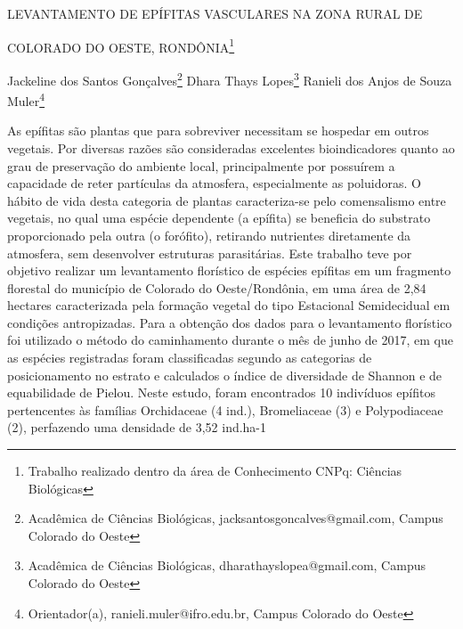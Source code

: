 \documentclass[article,12pt,onesidea,4paper,english,brazil]{abntex2}
\begin{document}
	
	
	\frenchspacing 
	
	\begin{center}
		\LARGE LEVANTAMENTO DE EPÍFITAS VASCULARES NA ZONA RURAL DE
		
		COLORADO DO OESTE, RONDÔNIA\footnote{Trabalho realizado dentro da área de Conhecimento CNPq: Ciências Biológicas}
		
		\normalsize
		Jackeline dos Santos Gonçalves\footnote{Acadêmica de Ciências Biológicas, jacksantosgoncalves@gmail.com, Campus Colorado do Oeste} 
		Dhara Thays Lopes\footnote{Acadêmica de Ciências Biológicas, dharathayslopea@gmail.com, Campus Colorado do Oeste} 
		Ranieli dos Anjos de Souza Muler\footnote{Orientador(a), ranieli.muler@ifro.edu.br, Campus Colorado do Oeste} 
		
	\end{center}
	
	\noindent As epífitas são plantas que para sobreviver necessitam se hospedar em outros
	vegetais. Por diversas razões são consideradas excelentes bioindicadores quanto ao
	grau de preservação do ambiente local, principalmente por possuírem a capacidade
	de reter partículas da atmosfera, especialmente as poluidoras. O hábito de vida
	desta categoria de plantas caracteriza-se pelo comensalismo entre vegetais, no qual
	uma espécie dependente (a epífita) se beneficia do substrato proporcionado pela
	outra (o forófito), retirando nutrientes diretamente da atmosfera, sem desenvolver
	estruturas parasitárias. Este trabalho teve por objetivo realizar um levantamento
	florístico de espécies epífitas em um fragmento florestal do município de Colorado
	do Oeste/Rondônia, em uma área de 2,84 hectares caracterizada pela formação
	vegetal do tipo Estacional Semidecidual em condições antropizadas. Para a
	obtenção dos dados para o levantamento florístico foi utilizado o método do
	caminhamento durante o mês de junho de 2017, em que as espécies registradas
	foram classificadas segundo as categorias de posicionamento no estrato e
	calculados o índice de diversidade de Shannon e de equabilidade de Pielou. Neste
	estudo, foram encontrados 10 indivíduos epífitos pertencentes às famílias
	Orchidaceae (4 ind.), Bromeliaceae (3) e Polypodiaceae (2), perfazendo uma
	densidade de 3,52 ind.ha-1
	
\end{document}
